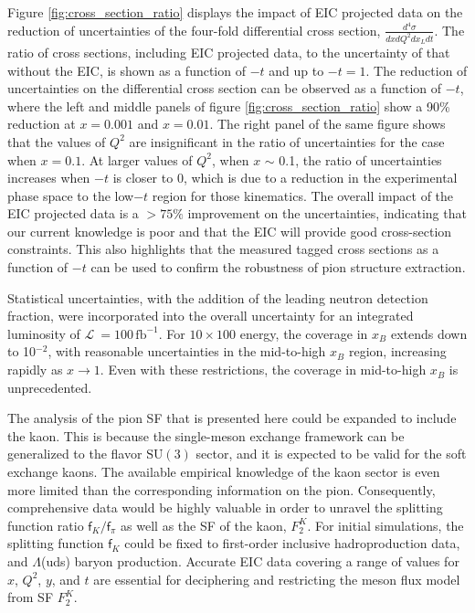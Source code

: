 \documentclass[
]{report}
\begin{document}


Figure \ref{fig:cross_section_ratio} displays the impact of EIC
projected data on the reduction of uncertainties of the four-fold
differential cross section, \(\frac{d^4\sigma}{dxdQ^2dx_Ldt}\). The
ratio of cross sections, including EIC projected data, to the
uncertainty of that without the EIC, is shown as a function of \(-t\)
and up to \(-t=1\). The reduction of uncertainties on the differential
cross section can be observed as a function of \(-t\), where the left
and middle panels of figure \ref{fig:cross_section_ratio} show a 90\%
reduction at \(x=0.001\) and \(x=0.01\). The right panel of the same
figure shows that the values of \(Q^2\) are insignificant in the ratio
of uncertainties for the case when \(x=0.1\). At larger values of
\(Q^2\), when \(x\) \(\sim\) 0.1, the ratio of uncertainties increases
when \(-t\) is closer to \(0\), which is due to a reduction in the
experimental phase space to the low\(-t\) region for those kinematics.
The overall impact of the EIC projected data is a \(>75\%\) improvement
on the uncertainties, indicating that our current knowledge is poor and
that the EIC will provide good cross-section constraints. This also
highlights that the measured tagged cross sections as a function of
\(-t\) can be used to confirm the robustness of pion structure
extraction.

Statistical uncertainties, with the addition of the leading neutron
detection fraction, were incorporated into the overall uncertainty for
an integrated luminosity of \(\mathcal{L}~=100\,\mathrm{fb}^{-1}\). For
\(10\times100\) energy, the coverage in \(x_B\) extends down to
10\(^{-2}\), with reasonable uncertainties in the mid-to-high \(x_B\)
region, increasing rapidly as \(x\rightarrow1\). Even with these
restrictions, the coverage in mid-to-high \(x_B\) is unprecedented.

The analysis of the pion SF that is presented here could be expanded to
include the kaon. This is because the single-meson exchange framework
can be generalized to the flavor \(\mathrm{SU}(3)\) sector, and it is
expected to be valid for the soft exchange kaons. The available
empirical knowledge of the kaon sector is even more limited than the
corresponding information on the pion. Consequently, comprehensive data
would be highly valuable in order to unravel the splitting function
ratio \({\mathsf f}_K/{\mathsf f}_\pi\) as well as the SF of the kaon,
\(F_2^K\). For initial simulations, the splitting function
\({\mathsf f}_K\) could be fixed to first-order inclusive
hadroproduction data, and \(\Lambda\)(uds) baryon production. Accurate
EIC data covering a range of values for \(x\), \(Q^2\), \(y\), and \(t\)
are essential for deciphering and restricting the meson flux model from
SF \(F_2^K\).
\end{document}

